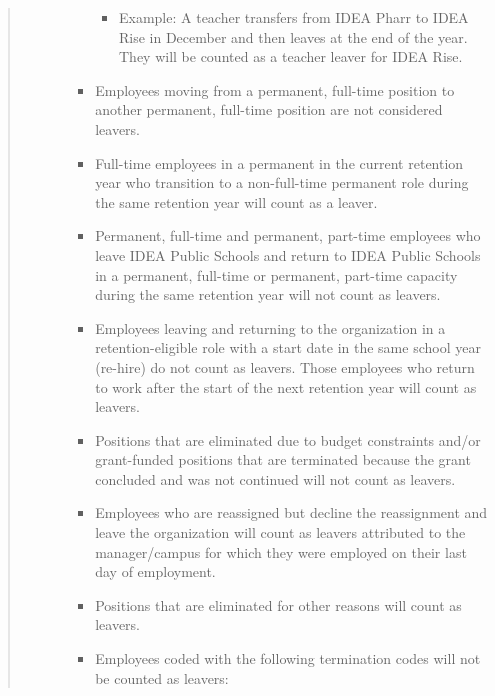 \documentclass[
  letterpaper,
  DIV=11,
  numbers=noendperiod]{scrreprt}
\providecommand{\tightlist}{%
  \setlength{\itemsep}{0pt}\setlength{\parskip}{0pt}}
\begin{document}
\begin{quote}
\begin{itemize}
\begin{itemize}
\begin{itemize}
      \begin{itemize}
      \tightlist
      \item
        Example: A teacher transfers from IDEA Pharr to IDEA Rise in
        December and then leaves at the end of the year. They will be
        counted as a teacher leaver for IDEA Rise.
      \end{itemize}
    \item
      Employees moving from a permanent, full-time position to another
      permanent, full-time position are not considered leavers.
    \item
      Full-time employees in a permanent in the current retention year
      who transition to a non-full-time permanent role during the same
      retention year will count as a leaver.
    \item
      Permanent, full-time and permanent, part-time employees who leave
      IDEA Public Schools and return to IDEA Public Schools in a
      permanent, full-time or permanent, part-time capacity during the
      same retention year will not count as leavers.
    \item
      Employees leaving and returning to the organization in a
      retention-eligible role with a start date in the same school year
      (re-hire) do not count as leavers. Those employees who return to
      work after the start of the next retention year will count as
      leavers.
    \item
      Positions that are eliminated due to budget constraints and/or
      grant-funded positions that are terminated because the grant
      concluded and was not continued will not count as leavers.
    \item
      Employees who are reassigned but decline the reassignment and
      leave the organization will count as leavers attributed to the
      manager/campus for which they were employed on their last day of
      employment.
    \item
      Positions that are eliminated for other reasons will count as
      leavers.
    \item
      Employees coded with the following termination codes will not be
      counted as leavers:


\end{itemize}
\end{itemize}
\end{itemize}
\end{quote}
\end{document}
